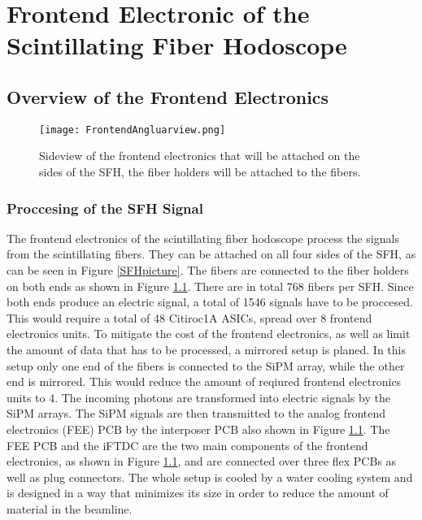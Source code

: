 \chapter{Frontend Electronic of the Scintillating Fiber Hodoscope}\label{cha:frontend}


\section{Overview of the Frontend Electronics}
\begin{figure}[h]
    \centering
    \texttt{[image: FrontendAngluarview.png]}
    \caption{Sideview of the frontend electronics that will be attached on the sides of the SFH, the fiber holders will be attached to the fibers.\autocite{InternalcommunicationKarl} }
    \label{fig:SideviewModelElectronics}
    \end{figure}
\subsection{Proccesing of the SFH Signal}
The frontend electronics of the scintillating fiber hodoscope process the signals from the scintillating fibers.
They can be attached on all four sides of the SFH, as can be seen in Figure \ref{SFHpicture}.
The fibers are connected to the fiber holders on both ends as shown in Figure \ref{fig:SideviewModelElectronics}. 
There are in total 768\autocite{Amber2022Status} fibers per SFH. Since both ends produce an electric signal,
a total of 1546 signals have to be proccesed. This would require a total of 48 Citiroc1A ASICs, spread over 8 frontend electronics units. 
To mitigate the cost of the frontend electronics, as well as limit the amount of data that has to be processed, a mirrored setup is planed.
In this setup only one end of the fibers is connected to the SiPM array, while the other end is mirrored. This would reduce the amount of reqiured frontend electronics units to 4.\autocite{InternalcommunicationKarl}
\newline
The incoming photons are transformed into electric signals by the SiPM arrays.
The SiPM signals are then transmitted to the analog frontend electronics (FEE) PCB by the interposer PCB also shown in Figure \ref{fig:SideviewModelElectronics}.
\newline
The FEE PCB and the iFTDC are the two main components of the frontend electronics, as shown in Figure \ref{fig:SideviewModelElectronics}, and are connected over three flex PCBs as well as plug connectors.
The whole setup is cooled by a water cooling system and is designed in a way that minimizes its size in order to reduce the amount of material in the beamline.\autocite{InternalcommunicationKarl}    
